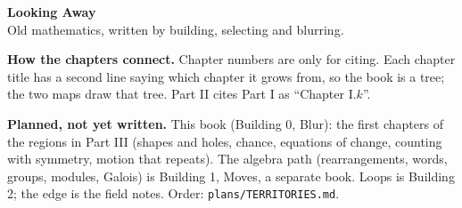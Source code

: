 


\begin{center}
{\Large\bfseries Looking Away}\\[4pt]
{\small Old mathematics, written by building, selecting and blurring.}
\end{center}

\renewcommand{\contentsname}{Contents}
\tableofcontents

\bigskip
\textbf{How the chapters connect.} Chapter numbers are only for citing. Each chapter title has a second line saying which chapter it grows from, so the book is a tree; the two maps draw that tree. Part II cites Part I as ``Chapter I.$k$''.

\textbf{Planned, not yet written.} This book (Building 0, Blur): the first chapters of the regions in Part III (shapes and holes, chance, equations of change, counting with symmetry, motion that repeats). The algebra path (rearrangements, words, groups, modules, Galois) is Building 1, Moves, a separate book. Loops is Building 2; the edge is the field notes. Order: \texttt{plans/TERRITORIES.md}.

